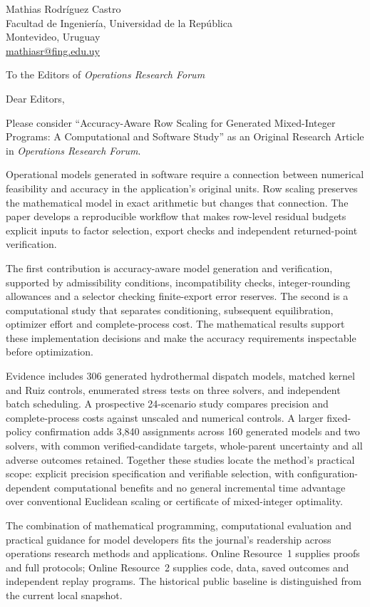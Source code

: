\documentclass[11pt]{article}
\begin{document}
\noindent Mathias Rodr\'iguez Castro\\
Facultad de Ingenier\'ia, Universidad de la Rep\'ublica\\
Montevideo, Uruguay\\
\href{mailto:mathiasr@fing.edu.uy}{mathiasr@fing.edu.uy}

\bigskip
\noindent To the Editors of \emph{Operations Research Forum}

\bigskip
\noindent Dear Editors,

\medskip
Please consider ``Accuracy-Aware Row Scaling for Generated Mixed-Integer Programs:
A Computational and Software Study'' as an Original Research Article in
\emph{Operations Research Forum}.

Operational models generated in software require a connection between numerical
feasibility and accuracy in the application's original units. Row scaling preserves
the mathematical model in exact arithmetic but changes that connection. The paper
develops a reproducible workflow that makes row-level residual budgets explicit
inputs to factor selection, export checks and independent returned-point verification.

The first contribution is accuracy-aware model generation and verification, supported
by admissibility conditions, incompatibility checks, integer-rounding allowances
and a selector checking finite-export error reserves. The second is a computational study that separates
conditioning, subsequent equilibration, optimizer effort and complete-process cost.
The mathematical results support these implementation decisions and make the
accuracy requirements inspectable before optimization.

Evidence includes 306 generated hydrothermal dispatch models, matched kernel and Ruiz
controls, enumerated stress tests on three solvers, and independent batch scheduling.
A prospective 24-scenario study compares precision and complete-process costs
against unscaled and numerical controls. A larger fixed-policy confirmation
adds 3,840 assignments across 160 generated models and two solvers, with common
verified-candidate targets, whole-parent uncertainty and all adverse outcomes
retained. Together these studies locate the method's practical scope: explicit
precision specification and verifiable selection, with configuration-dependent
computational benefits and no general incremental time advantage over
conventional Euclidean scaling or certificate of mixed-integer optimality.

The combination of mathematical programming, computational evaluation and practical
guidance for model developers fits the journal's readership across operations research
methods and applications. Online Resource~1 supplies proofs and full protocols;
Online Resource~2 supplies code, data, saved outcomes and independent replay programs.
The historical public baseline is distinguished from the current local snapshot.
\end{document}
